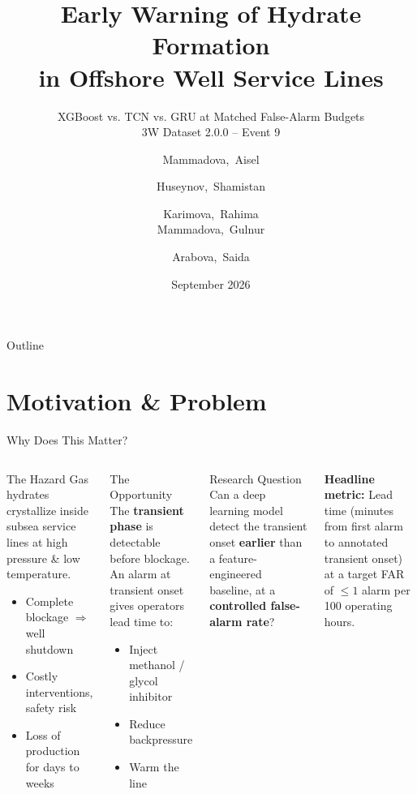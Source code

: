 \documentclass[aspectratio=169,10pt]{beamer}
\title[Hydrate Early Warning]{Early Warning of Hydrate Formation\\in Offshore Well Service Lines}
\subtitle[XGBoost vs. TCN vs. GRU at Matched FAR]{XGBoost vs. TCN vs. GRU at Matched False-Alarm Budgets\\
3W Dataset 2.0.0 -- Event 9}
\author[Team Enigma]{
  Mammadova,~Aisel \and Huseynov,~Shamistan \and Karimova,~Rahima\\
  Mammadova,~Gulnur \and Arabova,~Saida
}
\institute[AI Academy]{AI Academy, Baku, Azerbaijan\\
DLE-AI-202, Cohort I 2026 \(\cdot\) Track 2}
\date{September 2026}
\begin{document}

\begin{frame}[plain]
  \titlepage
\end{frame}

\begin{frame}{Outline}
  \tableofcontents
\end{frame}

\section{Motivation \& Problem}

\begin{frame}{Why Does This Matter?}
  \begin{columns}
      \begin{block}{The Hazard}
        Gas hydrates crystallize inside subsea service lines at high pressure \& low temperature.
        \begin{itemize}
          \item Complete blockage $\Rightarrow$ well shutdown
          \item Costly interventions, safety risk
          \item Loss of production for days to weeks
        \end{itemize}
      \end{block}
      \begin{block}{The Opportunity}
        The \textbf{transient phase} is detectable before blockage.\\
        An alarm at transient onset gives operators lead time to:
        \begin{itemize}
          \item Inject methanol / glycol inhibitor
          \item Reduce backpressure
          \item Warm the line
        \end{itemize}
      \end{block}
      \begin{alertblock}{Research Question}
        Can a deep learning model detect the transient onset \textbf{earlier} than a feature-engineered baseline, at a \textbf{controlled false-alarm rate}?
      \end{alertblock}
      \vspace{0.5em}
      \textbf{Headline metric:} Lead time (minutes from first alarm to annotated transient onset) at a target FAR of $\leq 1$ alarm per 100 operating hours.
  \end{columns}
\end{frame}
\end{document}
